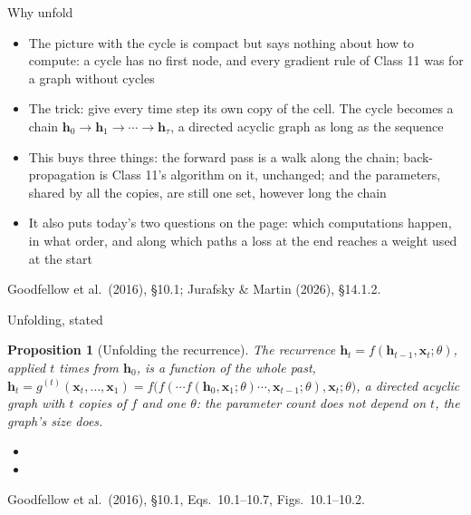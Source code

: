 \documentclass[aspectratio=169, 11pt]{beamer}
\newtheorem{propx}[theorem]{Proposition}
\newcommand{\srcline}[1]{%
  \par\vspace{0.25em}%
  {\scriptsize\color{mcMuted}\hfill #1\par}}
\begin{document}
\begin{frame}{Why unfold}
  \vspace{0.05em}
  {\footnotesize
  \begin{itemize}\itemsep0.25em
    \item The picture with the cycle is compact but says nothing about
          \alert{how to compute}: a cycle has no first node, and every
          gradient rule of Class 11 was for a graph without cycles
    \item The trick: give every time step its \alert{own copy} of the
          cell. The cycle becomes a chain $\mathbf{h}_0 \to \mathbf{h}_1 \to \cdots \to \mathbf{h}_\tau$,
          a directed acyclic graph as long as the sequence
    \item This buys three things: the forward pass is a walk along the
          chain; back-propagation is Class 11's algorithm on it,
          unchanged; and the parameters, shared by all the copies, are
          still one set, however long the chain
    \item It also puts today's two questions on the page: which
          computations happen, in what order, and along which paths a
          loss at the end reaches a weight used at the start
  \end{itemize}}
  \srcline{Goodfellow et al.\ (2016), \S10.1; Jurafsky \& Martin (2026), \S14.1.2.}
\end{frame}
\begin{frame}{Unfolding, stated}
  \vspace{-0.45em}
  \begin{propx}[Unfolding the recurrence]\label{th:unfold}
    \small
    The recurrence $\mathbf{h}_t = f(\mathbf{h}_{t-1}, \mathbf{x}_t; \theta)$,
    applied $t$ times from $\mathbf{h}_0$, is a function of the whole past,
    $\mathbf{h}_t = g^{(t)}(\mathbf{x}_t, \ldots, \mathbf{x}_1)
    = f\big(f(\cdots f(\mathbf{h}_0, \mathbf{x}_1; \theta) \cdots, \mathbf{x}_{t-1}; \theta), \mathbf{x}_t; \theta\big)$,
    a directed acyclic graph with $t$ copies of $f$ and one $\theta$: the
    parameter count does not depend on $t$, the graph's size does.
  \end{propx}
  \vspace{-0.1em}
  {\footnotesize
  \begin{itemize}\itemsep0.12em
    \item {}
    \item {}
  \end{itemize}}
  \vspace{-0.3em}
  \srcline{Goodfellow et al.\ (2016), \S10.1, Eqs.~10.1--10.7, Figs.~10.1--10.2.}
\end{frame}
\end{document}
